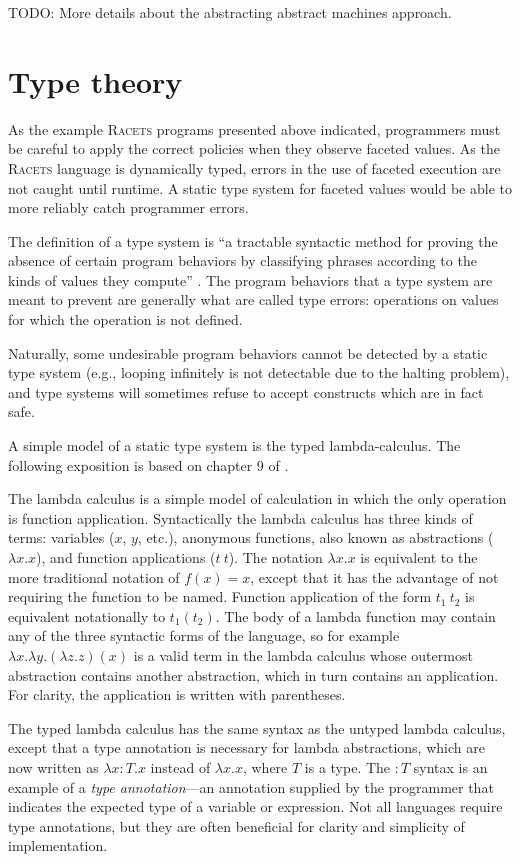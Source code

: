 \documentclass{article}
\begin{document}
TODO: More details about the abstracting abstract machines approach.



\section{Type theory}
As the example \textsc{Racets} programs presented above indicated, programmers must be careful to apply the correct policies when they observe faceted values. As the \textsc{Racets} language is dynamically typed, errors in the use of faceted execution are not caught until runtime. A static type system for faceted values would be able to more reliably catch programmer errors.

The definition of a type system is ``a tractable syntactic method for proving the absence of certain program behaviors by classifying phrases according to the kinds of values they compute'' \cite{types}. The program behaviors that a type system are meant to prevent are generally what are called type errors: operations on values for which the operation is not defined.

Naturally, some undesirable program behaviors cannot be detected by a static type system (e.g., looping infinitely is not detectable due to the halting problem), and type systems will sometimes refuse to accept constructs which are in fact safe.

A simple model of a static type system is the typed lambda-calculus. The following exposition is based on chapter 9 of \cite{types}.

The lambda calculus is a simple model of calculation in which the only operation is function application. Syntactically the lambda calculus has three kinds of terms: variables ($x$, $y$, etc.), anonymous functions, also known as abstractions ($\lambda x . x$), and function applications ($t\ t$). The notation $\lambda x . x$ is equivalent to the more traditional notation of $f(x) = x$, except that it has the advantage of not requiring the function to be named. Function application of the form $t_1\ t_2$ is equivalent notationally to $t_1(t_2)$. The body of a lambda function may contain any of the three syntactic forms of the language, so for example $\lambda x . \lambda y . (\lambda z . z)(x)$ is a valid term in the lambda calculus whose outermost abstraction contains another abstraction, which in turn contains an application. For clarity, the application is written with parentheses.

The typed lambda calculus has the same syntax as the untyped lambda calculus, except that a type annotation is necessary for lambda abstractions, which are now written as $\lambda x: T . x$ instead of $\lambda x. x$, where $T$ is a type. The $: T$ syntax is an example of a \textit{type annotation}---an annotation supplied by the programmer that indicates the expected type of a variable or expression. Not all languages require type annotations, but they are often beneficial for clarity and simplicity of implementation.
\end{document}
